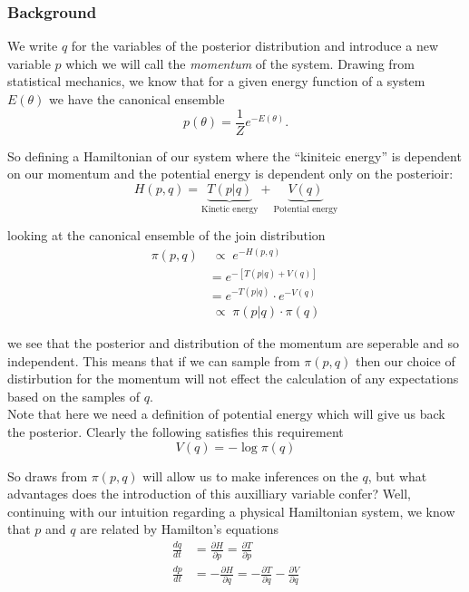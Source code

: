 \documentclass[11pt]{report}
\begin{document}
\subsubsection{Background}

We write $q$ for the variables of the posterior distribution and introduce a new variable $p$ which we will call the \emph{momentum} of the system. Drawing from statistical mechanics, we know that for a given energy function of a system $E(\theta)$ we have the canonical ensemble
\begin{equation}
  p(\theta) = \frac{1}{Z} e^{-E(\theta)}.
\end{equation}

So defining a Hamiltonian of our system where the ``kiniteic energy'' is dependent on our momentum and the potential energy is dependent only on the posterioir:
\begin{equation}
  H(p, q) = \underbrace{T(p|q)}_{\text{Kinetic energy}} + \underbrace{V(q)}_{\text{Potential energy}}
\end{equation} 

looking at the canonical ensemble of the join distribution
\begin{align}
  \pi(p, q) &\;{\propto} \; e^{-H(p, q)} \\
          &= e^{-[T(p|q) + V(q)]} \\
          &= e^{-T(p|q)} \cdot e^{-V(q)} \\
          &\;{\propto} \; \pi(p|q) \cdot \pi(q) 
\end{align}

we see that the posterior and distribution of the momentum are seperable and so independent. This means that if we can sample from $\pi(p, q)$ then our choice of distirbution for the momentum will not effect the calculation of any expectations based on the samples of $q$. \\

Note that here we need a definition of potential energy which will give us back the posterior. Clearly the following satisfies this requirement
\begin{equation}
  V(q) = - \log \pi(q)
\end{equation}

So draws from $\pi(p, q)$ will allow us to make inferences on the $q$, but what advantages does the introduction of this auxilliary variable confer? Well, continuing with our intuition regarding a physical Hamiltonian system, we know that $p$ and $q$ are related by Hamilton's equations
\begin{align}
\frac{dq}{dt} &= \frac{\partial H}{\partial p} = \frac{\partial T}{\partial p} \\
\frac{dp}{dt} &= - \frac{\partial H}{\partial q} = - \frac{\partial T}{\partial q} - \frac{\partial V}{\partial q}
\end{align}
\end{document}
